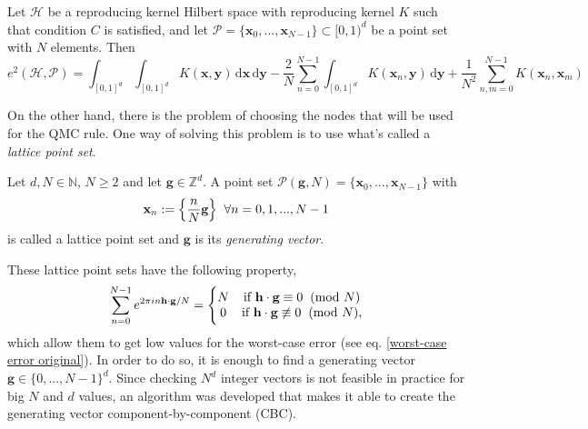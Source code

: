 \begin{Th}
    Let $\mathcal{H}$ be a reproducing kernel Hilbert space with reproducing kernel $K$ such that condition \textbf{$C$} is satisfied, and let $\mathcal{P} = \{ \textbf{x}_0,...,\textbf{x}_{N-1} \} \subset [0,1)^d$ be a point set with $N$ elements. Then
    \begin{equation} \label{worst-case error original}
        e^2(\mathcal{H},\mathcal{P}) = \int_{[0,1]^d} \int_{[0,1]^d} K(\textbf{x},\textbf{y}) \,\mathrm{d}\textbf{x} \,\mathrm{d}\textbf{y} - \frac{2}{N} \sum_{n=0}^{N-1} \int_{[0,1]^d} K(\textbf{x}_n,\textbf{y}) \,\mathrm{d}\textbf{y} + \frac{1}{N^2} \sum_{n,m=0}^{N-1} K(\textbf{x}_n,\textbf{x}_m)
    \end{equation}
\end{Th}

\vspace{4mm}
On the other hand, there is the problem of choosing the nodes that will be used for the QMC rule. One way of solving this problem is to use what's called a \textit{lattice point set}.\\

\begin{Def}
    Let $d,N \in \mathbb{N}$, $N\geq 2$ and let $\textbf{g}\in \mathbb{Z}^d$. A point set $\mathcal{P}(\textbf{g},N) = \{ \textbf{x}_0,...,\textbf{x}_{N-1} \}$ with 
    \begin{equation*}
        \textbf{x}_n := \Big\{ \frac{n}{N} \textbf{g} \Big\} \hspace{2mm} \forall n=0,1,...,N-1
    \end{equation*}
    is called a lattice point set and $\textbf{g}$ is its \textit{generating vector}.
\end{Def}

\vspace{2mm}
These lattice point sets have the following property,
\begin{equation*}
    \sum_{n=0}^{N-1} \exp{2\pi i n\textbf{h} \cdot \textbf{g} / N} = \Bigg\{ 
    \begin{matrix}
        N & \text{if } \textbf{h} \cdot \textbf{g} \equiv 0 \hspace{2mm} (\text{mod } N)\\
        0 & \text{if } \textbf{h} \cdot \textbf{g} \not\equiv 0 \hspace{2mm} (\text{mod } N),
    \end{matrix}
\end{equation*}
which allow them to get low values for the worst-case error (see eq. \ref{worst-case error original}). In order to do so, it is enough to find a generating vector $\textbf{g} \in \{ 0,...,N-1 \}^d$. Since checking $N^d$ integer vectors is not feasible in practice for big $N$ and $d$ values, an algorithm was developed that makes it able to create the generating vector component-by-component (CBC).\\

